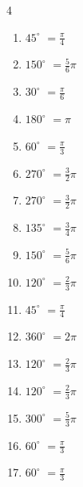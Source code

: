 \begin{multicols}{4}
\begin{enumerate}
  \item $\displaystyle 45^{\circ}$
        $\displaystyle =\frac{\pi}{4}$

  \item $\displaystyle 150^{\circ}$
        $\displaystyle =\frac{5}{6}\pi$

  \item $\displaystyle 30^{\circ}$
        $\displaystyle =\frac{\pi}{6}$

  \item $\displaystyle 180^{\circ}$
        $\displaystyle =\pi$

\columnbreak %

  \item $\displaystyle 60^{\circ}$
        $\displaystyle =\frac{\pi}{3}$

  \item $\displaystyle 270^{\circ}$
        $\displaystyle =\frac{3}{2}\pi$

  \item $\displaystyle 270^{\circ}$
        $\displaystyle =\frac{3}{2}\pi$

  \item $\displaystyle 135^{\circ}$
        $\displaystyle =\frac{3}{4}\pi$

  \item $\displaystyle 150^{\circ}$
        $\displaystyle =\frac{5}{6}\pi$

  \item $\displaystyle 120^{\circ}$
        $\displaystyle =\frac{2}{3}\pi$

  \item $\displaystyle 45^{\circ}$
        $\displaystyle =\frac{\pi}{4}$

  \item $\displaystyle 360^{\circ}$
        $\displaystyle =2\pi$

  \item $\displaystyle 120^{\circ}$
        $\displaystyle =\frac{2}{3}\pi$

  \item $\displaystyle 120^{\circ}$
        $\displaystyle =\frac{2}{3}\pi$

  \item $\displaystyle 300^{\circ}$
        $\displaystyle =\frac{5}{3}\pi$

  \item $\displaystyle 60^{\circ}$
        $\displaystyle =\frac{\pi}{3}$

  \item $\displaystyle 60^{\circ}$
        $\displaystyle =\frac{\pi}{3}$


\end{enumerate}
\end{multicols}
